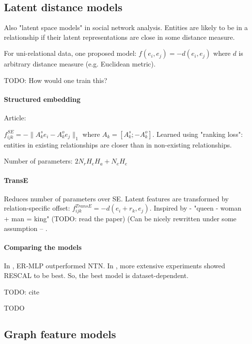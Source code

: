 \subsection{Latent distance models}

Also "latent space models" in social network analysis. Entities are likely to be
in a relationship if their latent representations are close in some distance
measure.

For uni-relational data, one proposed model: $f(e_i,e_j)=-d(e_i,e_j)$ where $d$
is arbitrary distance measure (e.g. Euclidean metric).

TODO: How would one train this?

\paragraph{Structured embedding}

Article: \cite{structured-embeddings}

$f_{ijk}^{SE}=-\|A_k^s e_i - A_k^o e_j\|_1$ where $A_k=[A_k^s; -A_k^o]$.
Learned using "ranking loss": entities in existing relationships are closer than
in non-existing relationships.

Number of parameters: $2N_r H_e H_a + N_e H_e$

\paragraph{TransE}

Reduces number of parameters over SE.
Latent features are transformed by relation-specific offset:
$f_{ijk}^{TransE}=-d(e_i+r_k,e_j)$.
Inspired by \cite{efficient-word-representation-estimation} - "queen - woman
+ man = king" (TODO: read the paper)
(Can be nicely rewritten under some assumption --
\cite{review-of-relational-ml-for-kgs}.

\paragraph{Comparing the models}

In \cite{knowledge-vault}, ER-MLP outperformed NTN.
In \cite{embedding-entities-and-relations}, more extensive experiments showed
RESCAL to be best.
So, the best model is dataset-dependent.

TODO: cite

TODO

\subsection{Graph feature models}

